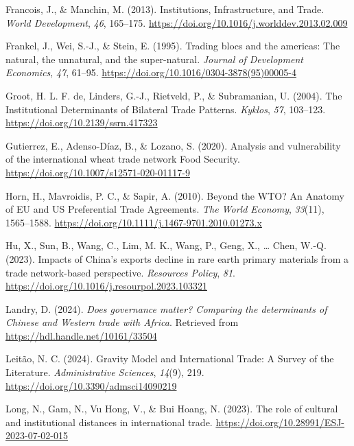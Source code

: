 \documentclass[
]{article}
\newlength{\cslhangindent}
\newenvironment{CSLReferences}[2] %
 {\begin{list}{}{%
  \setlength{\itemindent}{0pt}
  \setlength{\leftmargin}{0pt}
  \setlength{\parsep}{0pt}
  \ifodd #1
   \setlength{\leftmargin}{\cslhangindent}
   \setlength{\itemindent}{-1\cslhangindent}
  \fi
  \setlength{\itemsep}{#2\baselineskip}}}
 {\end{list}}
\begin{document}
\begin{CSLReferences}{1}{0}
Francois, J., \& Manchin, M. (2013). Institutions, {Infrastructure}, and
{Trade}. \emph{World Development}, \emph{46}, 165--175.
\url{https://doi.org/10.1016/j.worlddev.2013.02.009}

Frankel, J., Wei, S.-J., \& Stein, E. (1995). Trading blocs and the
americas: The natural, the unnatural, and the super-natural.
\emph{Journal of Development Economics}, \emph{47}, 61--95.
\url{https://doi.org/10.1016/0304-3878(95)00005-4}

Groot, H. L. F. de, Linders, G.-J., Rietveld, P., \& Subramanian, U.
(2004). The {Institutional} {Determinants} of {Bilateral} {Trade}
{Patterns}. \emph{Kyklos}, \emph{57}, 103--123.
\url{https://doi.org/10.2139/ssrn.417323}

Gutierrez, E., Adenso-Díaz, B., \& Lozano, S. (2020). Analysis and
vulnerability of the international wheat trade network {\textbar} {Food}
{Security}. \url{https://doi.org/10.1007/s12571-020-01117-9}

Horn, H., Mavroidis, P. C., \& Sapir, A. (2010). Beyond the {WTO}? {An}
{Anatomy} of {EU} and {US} {Preferential} {Trade} {Agreements}.
\emph{The World Economy}, \emph{33}(11), 1565--1588.
\url{https://doi.org/10.1111/j.1467-9701.2010.01273.x}

Hu, X., Sun, B., Wang, C., Lim, M. K., Wang, P., Geng, X., \ldots{}
Chen, W.-Q. (2023). Impacts of {China}'s exports decline in rare earth
primary materials from a trade network-based perspective.
\emph{Resources Policy}, \emph{81}.
\url{https://doi.org/10.1016/j.resourpol.2023.103321}

Landry, D. (2024). \emph{Does governance matter? {Comparing} the
determinants of {Chinese} and {Western} trade with {Africa}}. Retrieved
from \url{https://hdl.handle.net/10161/33504}

Leitão, N. C. (2024). Gravity {Model} and {International} {Trade}: {A}
{Survey} of the {Literature}. \emph{Administrative Sciences},
\emph{14}(9), 219. \url{https://doi.org/10.3390/admsci14090219}

Long, N., Gam, N., Vu Hong, V., \& Bui Hoang, N. (2023). The role of
cultural and institutional distances in international trade.
\url{https://doi.org/10.28991/ESJ-2023-07-02-015}


\end{CSLReferences}
\end{document}
